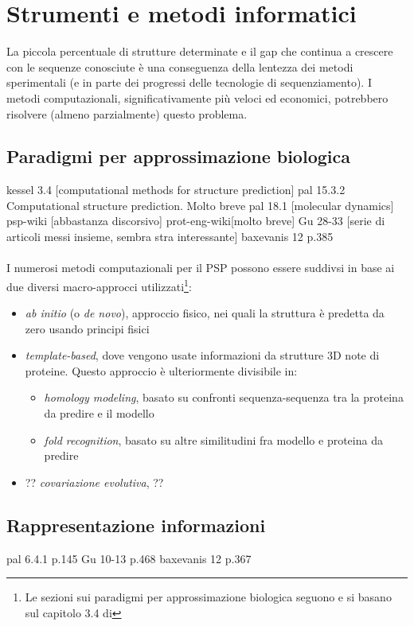 \section{Strumenti e metodi informatici}
La piccola percentuale di strutture determinate e il gap che continua a crescere con le sequenze conosciute è una conseguenza della lentezza dei metodi sperimentali (e in parte dei progressi delle tecnologie di sequenziamento). I metodi computazionali, significativamente più veloci ed economici, potrebbero risolvere (almeno parzialmente) questo problema.

\subsection{Paradigmi per approssimazione biologica}
kessel 3.4 [computational methods for structure prediction]
pal 15.3.2 Computational structure prediction. Molto breve
pal 18.1 [molecular dynamics]
psp-wiki [abbastanza discorsivo]
prot-eng-wiki[molto breve]
Gu 28-33 [serie di articoli messi insieme, sembra stra interessante]
baxevanis 12 p.385 \\ \\


I numerosi metodi computazionali per il PSP possono essere suddivsi in base ai due diversi macro-approcci utilizzati\footnote{Le sezioni sui paradigmi per approssimazione biologica seguono e si basano sul capitolo 3.4 di }:
\begin{itemize}
	\item \textit{ab initio} (o \textit{de novo}), approccio fisico, nei quali la struttura è predetta da zero usando principi fisici
	\item \textit{template-based}, dove vengono usate informazioni da strutture 3D note di proteine. Questo approccio è ulteriormente divisibile in:
	\begin{itemize}
		\item \textit{homology modeling}, basato su confronti sequenza-sequenza tra la proteina da predire e il modello
		\item \textit{fold recognition}, basato su altre similitudini fra modello e proteina da predire
	\end{itemize}
	\item ?? \textit{covariazione evolutiva}, ??
\end{itemize}


\subsection{Rappresentazione informazioni}
pal 6.4.1 p.145
Gu 10-13 p.468
baxevanis 12 p.367


